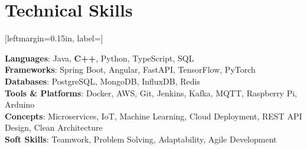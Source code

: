 \documentclass[letterpaper,11pt]{article}
\begin{document}
\section{Technical Skills}
\begin{itemize}[leftmargin=0.15in, label={]}
\small{\item{
\textbf{Languages}{: Java, \textbf{C++}, Python, TypeScript, SQL} \\
\textbf{Frameworks}{: Spring Boot, Angular, FastAPI, TensorFlow, PyTorch} \\
\textbf{Databases}{: PostgreSQL, MongoDB, InfluxDB, Redis} \\
\textbf{Tools & Platforms}{: Docker, AWS, Git, Jenkins, Kafka, MQTT, Raspberry Pi, Arduino} \\
\textbf{Concepts}{: Microservices, IoT, Machine Learning, Cloud Deployment, REST API Design, Clean Architecture} \\
\textbf{Soft Skills}{: Teamwork, Problem Solving, Adaptability, Agile Development}}}
\end{itemize}
\end{document}
